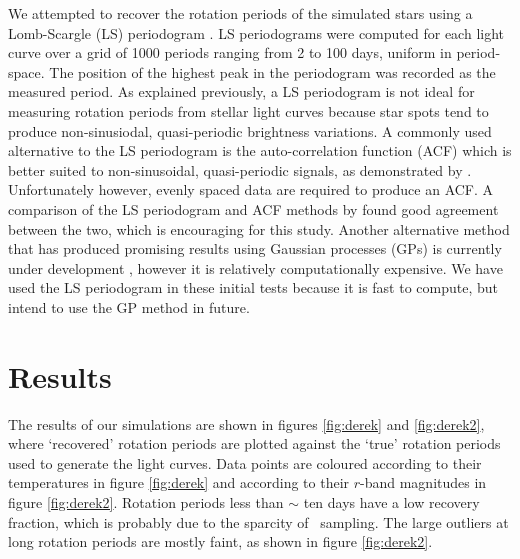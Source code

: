 We attempted to recover the rotation periods of the simulated stars using a
Lomb-Scargle (LS) periodogram \citep[][]{Lomb1976, Scargle1982}.
LS periodograms were computed for each light curve over a grid of 1000 periods
ranging from 2 to 100 days, uniform in period-space.
The position of the highest peak in the periodogram was recorded as the
measured period.
As explained previously, a LS periodogram is not ideal for measuring rotation
periods from stellar light curves because star spots tend to produce
non-sinusiodal, quasi-periodic brightness variations.
A commonly used alternative to the LS periodogram is the auto-correlation
function (ACF) which is better suited to non-sinusoidal, quasi-periodic
signals, as demonstrated by \citet{Mcquillan2013}.
Unfortunately however, evenly spaced data are required to produce an ACF.
A comparison of the LS periodogram and ACF methods by \citet{Aigrain2015b}
found good agreement between the two, which is encouraging for this study.
Another alternative method that has produced promising results using Gaussian
processes (GPs) is currently under development \citep{Angus2015b}, however it
is relatively computationally expensive.
We have used the LS periodogram in these initial tests because it is fast to
compute, but intend to use the GP method in future.

\section{Results}
\label{sec:LSST_results}

The results of our simulations are shown in figures \ref{fig:derek} and
\ref{fig:derek2}, where `recovered' rotation periods are plotted against the
`true' rotation periods used to generate the light curves.
Data points are coloured according to their temperatures in figure
\ref{fig:derek} and according to their $r$-band magnitudes in figure
\ref{fig:derek2}.
Rotation periods less than $\sim$ ten days have a low recovery fraction, which
is probably due to the sparcity of \LSST\ sampling.
The large outliers at long rotation periods are mostly faint, as shown in
figure \ref{fig:derek2}.

